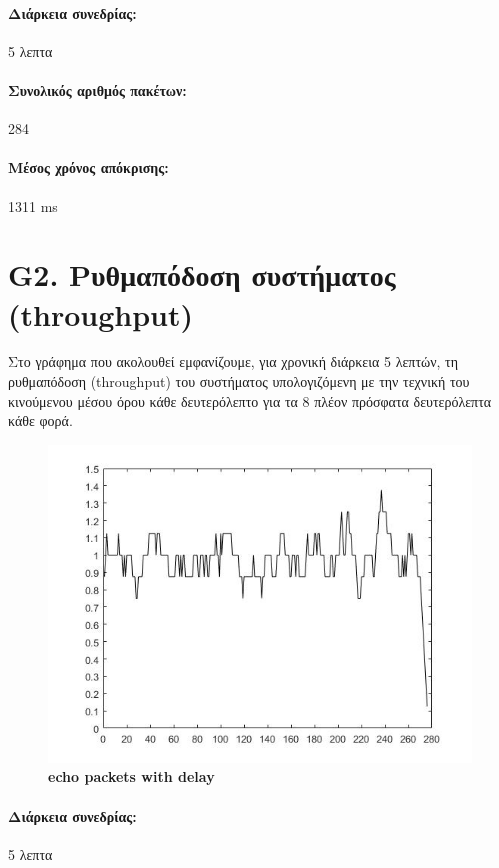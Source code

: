 \documentclass{article}
\begin{document}
\paragraph{Διάρκεια συνεδρίας:} 5 λεπτα
\paragraph{Συνολικός αριθμός πακέτων: }284
\paragraph{Μέσος χρόνος απόκρισης: }1311 ms
\newpage
\large{}
\section*{G2. Ρυθμαπόδοση συστήματος (throughput)}
Στο γράφημα που ακολουθεί εμφανίζουμε, για χρονική διάρκεια 5 λεπτών, τη ρυθμαπόδοση (throughput) του συστήματος υπολογιζόμενη με
την τεχνική του κινούμενου μέσου όρου κάθε δευτερόλεπτο για τα 8 πλέον πρόσφατα δευτερόλεπτα κάθε φορά.

\begin{figure}[h!]
 \begin{center}
  \advance\leftskip-1.5cm
  \includegraphics[width=150mm,scale=0.7]{g2s2.jpg}
    \caption*{\textbf{echo packets with delay}}
  
\end{center}
\end{figure}
\paragraph{Διάρκεια συνεδρίας:} 5 λεπτα
\newpage
\large{}
\end{document}
